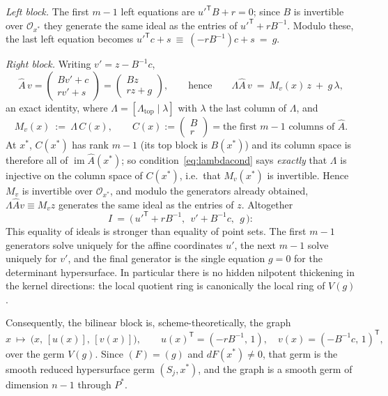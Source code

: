 \documentclass[acmsmall,screen,nonacm]{acmart}
\theoremstyle{definition}
\theoremstyle{remark}
\DeclareMathOperator{\im}{im}
\newcommand{\OO}{\mathcal{O}}
\begin{document}
\emph{Left block.}  The first $m-1$ left equations are
$u'^{\mathsf T}B+r=0$; since $B$ is invertible over $\OO_{x^*}$ they
generate the same ideal as the entries of
$u'^{\mathsf T}+rB^{-1}$.  Modulo these, the last left equation
becomes
$u'^{\mathsf T}c+s\ \equiv\ (-rB^{-1})c+s\ =\ g$.

\emph{Right block.}  Writing $v'=z-B^{-1}c$,
\[
  \widehat A\,v
  =\begin{pmatrix}Bv'+c\\ rv'+s\end{pmatrix}
  =\begin{pmatrix}Bz\\ rz+g\end{pmatrix},
  \qquad\text{hence}\qquad
  \Lambda\widehat A\,v\ =\ M_v(x)\,z\ +\ g\,\lambda ,
\]
an exact identity, where $\Lambda=[\Lambda_{\mathrm{top}}\mid\lambda]$
with $\lambda$ the last column of $\Lambda$, and
\[
  M_v(x)\ :=\ \Lambda\,C(x),\qquad
  C(x):=\begin{pmatrix}B\\ r\end{pmatrix}
  =\text{the first }m-1\text{ columns of }\widehat A .
\]
At $x^*$, $C(x^*)$ has rank $m-1$ (its top block is $B(x^*)$) and its
column space is therefore all of $\im\widehat A(x^*)$; so
condition~\eqref{eq:lambdacond} says \emph{exactly} that $\Lambda$ is
injective on the column space of $C(x^*)$, i.e.\ that $M_v(x^*)$ is
invertible.  Hence $M_v$ is invertible over $\OO_{x^*}$, and modulo
the generators already obtained,
$\Lambda\widehat Av\equiv M_vz$ generates the same ideal as the
entries of $z$.  Altogether
\begin{equation}\label{eq:normalform}
  I\ =\ \big(\,u'^{\mathsf T}+rB^{-1},\ \ v'+B^{-1}c,\ \ g\,\big):
\end{equation}
This equality of ideals is stronger than equality of point sets.  The first
$m-1$ generators solve uniquely for the affine coordinates $u'$, the next
$m-1$ solve uniquely for $v'$, and the final generator is the single equation
$g=0$ for the determinant hypersurface.  In particular there is no hidden
nilpotent thickening in the kernel directions: the local quotient ring is
canonically the local ring of $V(g)$.

Consequently, the bilinear block is, scheme-theoretically, the graph
\[
  x\ \longmapsto\ \big(x,\,[u(x)],\,[v(x)]\big),
  \qquad
  u(x)^{\mathsf T}=(-rB^{-1},\,1),\quad
  v(x)=(-B^{-1}c,\,1)^{\mathsf T},
\]
over the germ $V(g)$.  Since $(F)=(g)$ and $dF(x^*)\ne0$, that germ is
the smooth reduced hypersurface germ $(S_j,x^*)$, and the graph is a
smooth germ of dimension $n-1$ through $P^*$.
\end{document}
